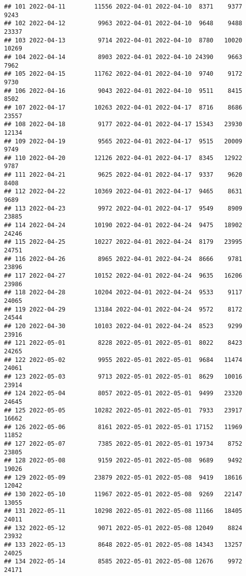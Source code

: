 \documentclass[
]{article}
\begin{document}
\begin{verbatim}
## 101 2022-04-11        11556 2022-04-01 2022-04-10  8371    9377       9243
## 102 2022-04-12         9963 2022-04-01 2022-04-10  9648    9488      23337
## 103 2022-04-13         9714 2022-04-01 2022-04-10  8780   10020      10269
## 104 2022-04-14         8903 2022-04-01 2022-04-10 24390    9663       7962
## 105 2022-04-15        11762 2022-04-01 2022-04-10  9740    9172       9730
## 106 2022-04-16         9043 2022-04-01 2022-04-10  9511    8415       8502
## 107 2022-04-17        10263 2022-04-01 2022-04-17  8716    8686      23557
## 108 2022-04-18         9177 2022-04-01 2022-04-17 15343   23930      12134
## 109 2022-04-19         9565 2022-04-01 2022-04-17  9515   20009       9749
## 110 2022-04-20        12126 2022-04-01 2022-04-17  8345   12922       9787
## 111 2022-04-21         9625 2022-04-01 2022-04-17  9337    9620       8408
## 112 2022-04-22        10369 2022-04-01 2022-04-17  9465    8631       9689
## 113 2022-04-23         9972 2022-04-01 2022-04-17  9549    8909      23885
## 114 2022-04-24        10190 2022-04-01 2022-04-24  9475   18902      24246
## 115 2022-04-25        10227 2022-04-01 2022-04-24  8179   23995      24751
## 116 2022-04-26         8965 2022-04-01 2022-04-24  8666    9781      23896
## 117 2022-04-27        10152 2022-04-01 2022-04-24  9635   16206      23986
## 118 2022-04-28        10204 2022-04-01 2022-04-24  9533    9117      24065
## 119 2022-04-29        13184 2022-04-01 2022-04-24  9572    8172      24544
## 120 2022-04-30        10103 2022-04-01 2022-04-24  8523    9299      23916
## 121 2022-05-01         8228 2022-05-01 2022-05-01  8022    8423      24265
## 122 2022-05-02         9955 2022-05-01 2022-05-01  9684   11474      24061
## 123 2022-05-03         9713 2022-05-01 2022-05-01  8629   10016      23914
## 124 2022-05-04         8057 2022-05-01 2022-05-01  9499   23320      24645
## 125 2022-05-05        10282 2022-05-01 2022-05-01  7933   23917      16662
## 126 2022-05-06         8161 2022-05-01 2022-05-01 17152   11969      11852
## 127 2022-05-07         7385 2022-05-01 2022-05-01 19734    8752      23805
## 128 2022-05-08         9159 2022-05-01 2022-05-08  9689    9492      19026
## 129 2022-05-09        23879 2022-05-01 2022-05-08  9419   18616      12042
## 130 2022-05-10        11967 2022-05-01 2022-05-08  9269   22147      13055
## 131 2022-05-11        10298 2022-05-01 2022-05-08 11166   18405      24011
## 132 2022-05-12         9071 2022-05-01 2022-05-08 12049    8824      23932
## 133 2022-05-13         8648 2022-05-01 2022-05-08 14343   13257      24025
## 134 2022-05-14         8585 2022-05-01 2022-05-08 12676    9972      24171

\end{verbatim}
\end{document}
